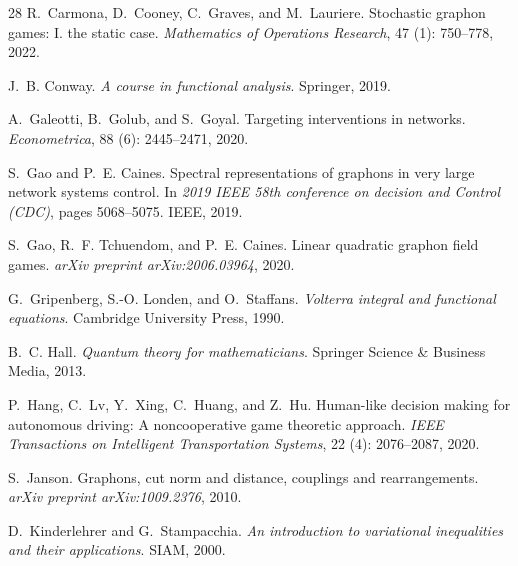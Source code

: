 \documentclass[11pt]{article}
\numberwithin{equation}{section}
\begin{document}
\begin{thebibliography}{28}
R.~Carmona, D.~Cooney, C.~Graves, and M.~Lauriere.
\newblock Stochastic graphon games: I. the static case.
\newblock \emph{Mathematics of Operations Research}, 47 (1): 750--778, 2022.

J.~B. Conway.
\newblock \emph{A course in functional analysis}.
\newblock Springer, 2019.

A.~Galeotti, B.~Golub, and S.~Goyal.
\newblock Targeting interventions in networks.
\newblock \emph{Econometrica}, 88 (6): 2445--2471, 2020.

S.~Gao and P.~E. Caines.
\newblock Spectral representations of graphons in very large network systems control.
\newblock In \emph{2019 IEEE 58th conference on decision and Control (CDC)}, pages 5068--5075. IEEE, 2019.

S.~Gao, R.~F. Tchuendom, and P.~E. Caines.
\newblock Linear quadratic graphon field games.
\newblock \emph{arXiv preprint arXiv:2006.03964}, 2020.

G.~Gripenberg, S.-O. Londen, and O.~Staffans.
\newblock \emph{Volterra integral and functional equations}.
\newblock Cambridge University Press, 1990.

B.~C. Hall.
\newblock \emph{Quantum theory for mathematicians}.
\newblock Springer Science \& Business Media, 2013.

P.~Hang, C.~Lv, Y.~Xing, C.~Huang, and Z.~Hu.
\newblock Human-like decision making for autonomous driving: A noncooperative game theoretic approach.
\newblock \emph{IEEE Transactions on Intelligent Transportation Systems}, 22 (4): 2076--2087, 2020.

S.~Janson.
\newblock Graphons, cut norm and distance, couplings and rearrangements.
\newblock \emph{arXiv preprint arXiv:1009.2376}, 2010.

D.~Kinderlehrer and G.~Stampacchia.
\newblock \emph{An introduction to variational inequalities and their applications}.
\newblock SIAM, 2000.


\end{thebibliography}
\end{document}
